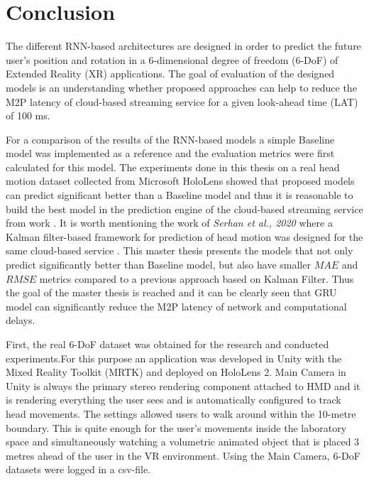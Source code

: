 \chapter{Conclusion}
\label{sec:conclusion}
The different RNN-based architectures are designed in order to predict the future user's position and rotation in a 6-dimensional degree of freedom (6-DoF) of Extended Reality (XR) applications. The goal of evaluation of the designed models is an understanding whether proposed approaches can help to reduce the M2P latency of cloud-based streaming service for a given look-ahead time (LAT) of 100 ms. 

For a comparison of the results of the RNN-based models a simple Baseline model was implemented as a reference and the evaluation metrics were first calculated for this model. The experiments done in this thesis on a real head motion dataset collected from Microsoft HoloLens showed that proposed models can predict significant better than a Baseline model and thus it is reasonable to build the best model in the prediction engine of the cloud-based streaming service from work \cite{serhan_cloud_streaming}. It is worth mentioning the work of \textit{Serhan et al., 2020} where a Kalman filter-based framework for prediction of head motion was designed for the same cloud-based service \cite{serhan_kalman}. This master thesis presents the models that not only predict significantly better than Baseline model, but also have smaller $MAE$ and $RMSE$ metrics compared to a previous approach based on Kalman Filter. Thus the goal of the master thesis is reached and it can be clearly seen that GRU model can significantly reduce the M2P latency of network and computational delays.  

First, the real 6-DoF dataset was obtained for the research and conducted experiments.For this purpose an application was developed in Unity with the Mixed Reality Toolkit (MRTK) and deployed on HoloLens 2. Main Camera in Unity is always the primary stereo rendering component attached to HMD and it is rendering everything the user sees and is automatically configured to track head movements. The settings allowed users to walk around within the 10-metre boundary. This is quite enough for the user's movements inside the laboratory space and simultaneously watching a volumetric animated object that is placed 3 metres ahead of the user in the VR environment. Using the Main Camera, 6-DoF datasets were logged in a csv-file.

